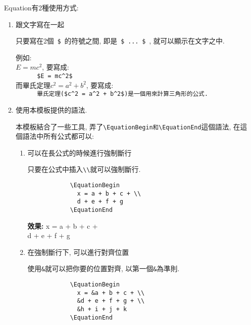 {}
Equation有2種使用方式:
  \begin{enumerate}
    \item
    {
      跟文字寫在一起

      只要寫在2個\verb| $ |的符號之間, 即是\verb| $ ... $ |, 就可以顯示在文字之中.

      \noindent 例如:\\
      $E = mc^2$, 要寫成:\\
      \verb|      $E = mc^2$|\\
      而畢氏定理$c^2 = a^2 + b^2$, 要寫成:\\
      \verb|      畢氏定理($c^2 = a^2 + b^2$)是一個用來計算三角形的公式.|
    } %

    \newpage
    \item
    {
      使用本模板提供的語法.

      本模板結合了一些工具, 弄了\verb|\EquationBegin和\EquationEnd|這個語法, 在這個語法中所有公式都可以:
      \begin{enumerate}
        \item
        {
          可以在長公式的時候進行強制斷行

          只要在公式中插入\verb|\\|就可以強制斷行.
          \begin{verbatim}
            \EquationBegin
              x = a + b + c + \\
              d + e + f + g
            \EquationEnd
          \end{verbatim}

          {\bf 效果:}
          \EquationBegin
            x = a + b + c + \\
            d + e + f + g
          \EquationEnd
        } %

        \label{chapter:how-to:write:equation:label-example}
        \item
        {
          在強制斷行下, 可以進行對齊位置

          使用\verb|&|就可以把你要的位置對齊, 以第一個\verb|&|為準則.
          \begin{verbatim}
            \EquationBegin
              x = &a + b + c + \\
              &d + e + f + g + \\
              &h + i + j + k
            \EquationEnd
          \end{verbatim}

}
\end{enumerate}}
\end{enumerate}
